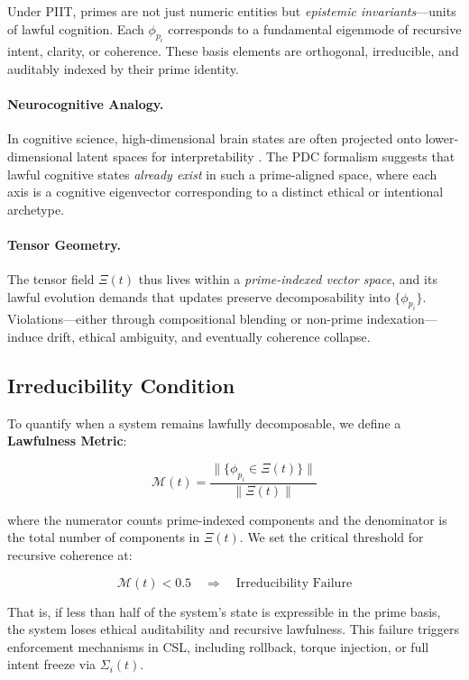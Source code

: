 \documentclass[12]{amsart}
\theoremstyle{plain}
\begin{document}
Under PIIT, primes are not just numeric entities but \textit{epistemic invariants}—units of lawful cognition. Each $\phi_{p_i}$ corresponds to a fundamental eigenmode of recursive intent, clarity, or coherence. These basis elements are orthogonal, irreducible, and auditably indexed by their prime identity.

\paragraph{Neurocognitive Analogy.}
In cognitive science, high-dimensional brain states are often projected onto lower-dimensional latent spaces for interpretability \cite{ghahramani2000unsupervised}. The PDC formalism suggests that lawful cognitive states \emph{already exist} in such a prime-aligned space, where each axis is a cognitive eigenvector corresponding to a distinct ethical or intentional archetype.

\paragraph{Tensor Geometry.}
The tensor field $\Xi(t)$ thus lives within a \emph{prime-indexed vector space}, and its lawful evolution demands that updates preserve decomposability into $\{ \phi_{p_i} \}$. Violations—either through compositional blending or non-prime indexation—induce drift, ethical ambiguity, and eventually coherence collapse.

\subsection{Irreducibility Condition}

To quantify when a system remains lawfully decomposable, we define a \textbf{Lawfulness Metric}:

\[
\mathcal{M}(t) = \frac{ \| \{ \phi_{p_i} \in \Xi(t) \} \| }{ \| \Xi(t) \| }
\]

where the numerator counts prime-indexed components and the denominator is the total number of components in $\Xi(t)$. We set the critical threshold for recursive coherence at:

\[
\mathcal{M}(t) < 0.5 \quad \Rightarrow \quad \text{Irreducibility Failure}
\]

That is, if less than half of the system’s state is expressible in the prime basis, the system loses ethical auditability and recursive lawfulness. This failure triggers enforcement mechanisms in CSL, including rollback, torque injection, or full intent freeze via $\Sigma_i(t)$.
\end{document}
